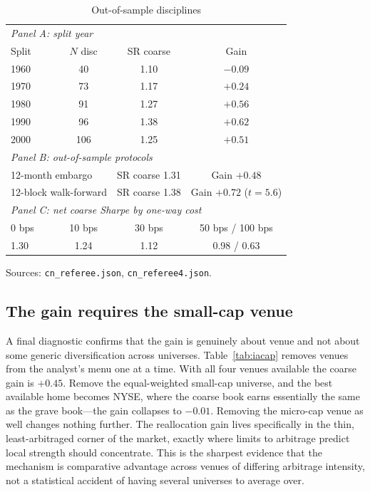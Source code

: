 \documentclass[12pt]{article}
\theoremstyle{plain}
\theoremstyle{definition}
\begin{document}
\begin{table}[t]
\centering
\caption{Out-of-sample disciplines}
\label{tab:iasplit}
\begin{threeparttable}
\begin{tabular}{lccc}
\toprule
\multicolumn{4}{l}{\emph{Panel A: split year}}\\
Split & $N$ disc & SR coarse & Gain \\
\midrule
1960 & 40  & 1.10 & $-0.09$ \\
1970 & 73  & 1.17 & $+0.24$ \\
1980 & 91  & 1.27 & $+0.56$ \\
1990 & 96  & 1.38 & $+0.62$ \\
2000 & 106 & 1.25 & $+0.51$ \\
\midrule
\multicolumn{4}{l}{\emph{Panel B: out-of-sample protocols}}\\
\multicolumn{2}{l}{12-month embargo} & SR coarse 1.31 & Gain $+0.48$ \\
\multicolumn{2}{l}{12-block walk-forward} & SR coarse 1.38 & Gain $+0.72$ ($t{=}5.6$) \\
\midrule
\multicolumn{4}{l}{\emph{Panel C: net coarse Sharpe by one-way cost}}\\
0 bps & 10 bps & 30 bps & 50 bps / 100 bps \\
1.30 & 1.24 & 1.12 & 0.98 / 0.63 \\
\bottomrule
\end{tabular}
\begin{tablenotes}\footnotesize
\item Sources: \texttt{cn\_referee.json}, \texttt{cn\_referee4.json}.
\end{tablenotes}
\end{threeparttable}
\end{table}

\subsection{The gain requires the small-cap venue}

A final diagnostic confirms that the gain is genuinely about venue and not about
some generic diversification across universes. Table~\ref{tab:iacap} removes
venues from the analyst's menu one at a time. With all four venues available the
coarse gain is $+0.45$. Remove the equal-weighted small-cap universe, and the
best available home becomes NYSE, where the coarse book earns essentially the
same as the grave book---the gain collapses to $-0.01$. Removing the micro-cap
venue as well changes nothing further. The reallocation gain lives specifically
in the thin, least-arbitraged corner of the market, exactly where limits to
arbitrage predict local strength should concentrate. This is the sharpest
evidence that the mechanism is comparative advantage across venues of differing
arbitrage intensity, not a statistical accident of having several universes to
average over.
\end{document}
